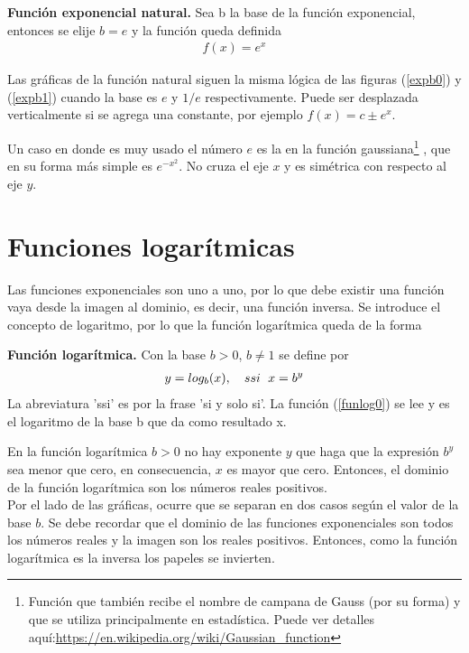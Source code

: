 \begin{mydef}
\textbf{Función exponencial natural. } Sea b la base de la función exponencial, entonces se elije $b=e$ y la función queda definida
\begin{eqnarray}
f(x)=e^{x}
\end{eqnarray}
\end{mydef}
Las gráficas de la función natural siguen la misma lógica de las figuras (\ref{expb0}) y (\ref{expb1}) cuando la base es $e$ y $1/e$ respectivamente. Puede ser desplazada verticalmente si se agrega una constante, por ejemplo $f(x)=c\pm e^{x}$.

Un caso en donde es muy usado el número $e$ es la en la función gaussiana\footnote{Función que también recibe el nombre de campana de Gauss (por su forma) y que se utiliza principalmente en estadística. Puede ver detalles aquí:\url{https://en.wikipedia.org/wiki/Gaussian_function} }  , que en su forma más simple es $e^{-x^2}$. No cruza el eje $x$ y es simétrica  con respecto al eje $y$.
\section{Funciones logarítmicas}

Las funciones exponenciales son uno a uno, por lo que debe existir una función vaya desde la imagen al dominio, es decir, una función inversa. Se introduce el concepto de logaritmo, por lo que la función logarítmica queda de la forma
\begin{mydef}
\textbf{Función logarítmica. } Con la base $b>0$, $b\neq 1$ se define por
\begin{eqnarray}
y=log_{b}(x), \hspace{10px} ssi \hspace{6px} x=b^{y}
\label{funlog0}
\end{eqnarray}
La abreviatura 'ssi' es por la frase 'si y solo si'. La función (\ref{funlog0})  se lee y es el logaritmo de la base b que da como resultado x.
\end{mydef}

En la función logarítmica $b>0$ no hay exponente $y$ que haga que la expresión $b^{y}$ sea menor que cero, en consecuencia, $x$ es mayor que cero. Entonces, el dominio de la función logarítmica son los números reales positivos.\\

Por el lado de las gráficas, ocurre que se separan en dos casos según el valor de la base $b$. Se debe recordar que el dominio de las funciones exponenciales son todos los números reales y la imagen son los reales positivos. Entonces, como la función logarítmica es la inversa los papeles se invierten.

